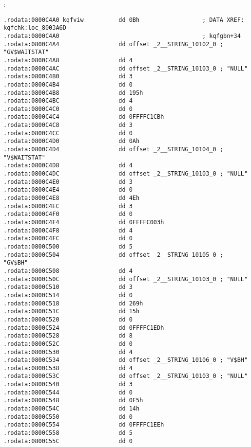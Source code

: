 
:

\begin{lstlisting}[caption=kqf.o]
.rodata:0800C4A0 kqfviw          dd 0Bh                  ; DATA XREF: kqfchk:loc_8003A6D
.rodata:0800C4A0                                         ; kqfgbn+34
.rodata:0800C4A4                 dd offset _2__STRING_10102_0 ; "GV$WAITSTAT"
.rodata:0800C4A8                 dd 4
.rodata:0800C4AC                 dd offset _2__STRING_10103_0 ; "NULL"
.rodata:0800C4B0                 dd 3
.rodata:0800C4B4                 dd 0
.rodata:0800C4B8                 dd 195h
.rodata:0800C4BC                 dd 4
.rodata:0800C4C0                 dd 0
.rodata:0800C4C4                 dd 0FFFFC1CBh
.rodata:0800C4C8                 dd 3
.rodata:0800C4CC                 dd 0
.rodata:0800C4D0                 dd 0Ah
.rodata:0800C4D4                 dd offset _2__STRING_10104_0 ; "V$WAITSTAT"
.rodata:0800C4D8                 dd 4
.rodata:0800C4DC                 dd offset _2__STRING_10103_0 ; "NULL"
.rodata:0800C4E0                 dd 3
.rodata:0800C4E4                 dd 0
.rodata:0800C4E8                 dd 4Eh
.rodata:0800C4EC                 dd 3
.rodata:0800C4F0                 dd 0
.rodata:0800C4F4                 dd 0FFFFC003h
.rodata:0800C4F8                 dd 4
.rodata:0800C4FC                 dd 0
.rodata:0800C500                 dd 5
.rodata:0800C504                 dd offset _2__STRING_10105_0 ; "GV$BH"
.rodata:0800C508                 dd 4
.rodata:0800C50C                 dd offset _2__STRING_10103_0 ; "NULL"
.rodata:0800C510                 dd 3
.rodata:0800C514                 dd 0
.rodata:0800C518                 dd 269h
.rodata:0800C51C                 dd 15h
.rodata:0800C520                 dd 0
.rodata:0800C524                 dd 0FFFFC1EDh
.rodata:0800C528                 dd 8
.rodata:0800C52C                 dd 0
.rodata:0800C530                 dd 4
.rodata:0800C534                 dd offset _2__STRING_10106_0 ; "V$BH"
.rodata:0800C538                 dd 4
.rodata:0800C53C                 dd offset _2__STRING_10103_0 ; "NULL"
.rodata:0800C540                 dd 3
.rodata:0800C544                 dd 0
.rodata:0800C548                 dd 0F5h
.rodata:0800C54C                 dd 14h
.rodata:0800C550                 dd 0
.rodata:0800C554                 dd 0FFFFC1EEh
.rodata:0800C558                 dd 5
.rodata:0800C55C                 dd 0
\end{lstlisting}

